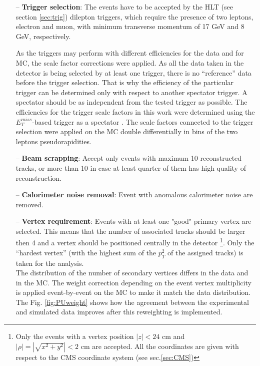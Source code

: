 \begin{itemize}
 \item [--] \textbf{Trigger selection}: The events have to be accepted by the HLT (see section \ref{sec:trig}) dilepton triggers, which require the presence of two leptons, electron and muon, with
 minimum transverse momentum of 17 GeV and 8 GeV, respectively.
 
 As the triggers may perform with different efficiencies for the data and for MC, the scale factor corrections were applied. As all the data taken in the detector is being selected by 
 at least one trigger, there is no ``reference'' data before the trigger selection. That is why the efficiency of the particular trigger can be determined only with respect to another
 spectator trigger. A spectator should be as independent from the tested trigger as possible. The efficiencies for the trigger scale factors in this work were 
 determined using the $E_{T}^{miss}$-based trigger as a spectator \cite{Asin2014Auth}. The scale factors connected to the trigger selection were applied on the MC 
 double differentially in bins of the two leptons pseudorapidities. 
 \item [--] \textbf{Beam scrapping}: Accept only events with maximum 10 reconstructed tracks, or more than 10 in case at least quarter of them has high quality of reconstruction.
 \item [--] \textbf{Calorimeter noise removal}: Event with anomalous calorimeter noise are removed.
 \item [--] \textbf{Vertex requirement}: Events with at least one "good" primary vertex are selected.
 This means that the number of associated tracks should be larger then 4 and a vertex should be positioned centrally in the detector
 \footnote{Only the events with a vertex position $|z| < \textrm{24 cm}$ and $|\rho| = |\sqrt{x^{2} + y^{2}}| < \textrm{2 cm}$ are accepted. All the coordinates
 are given with respect to the CMS coordinate system (see sec.\ref{sec:CMS})}. Only the ``hardest vertex'' 
 (with the highest sum of the $p_{T}^{2}$ of the assigned tracks) is taken for the analysis. 
 \\
 The distribution of the number of secondary vertices differs in the data and in the MC. The weight correction depending on the event vertex multiplicity is applied
 event-by-event on the MC to make it match the data distribution.
 The Fig. \ref{fig:PUweight} shows how the agreement
 between the experimental and simulated data improves after this reweighting is implemented.
 

\end{itemize}
